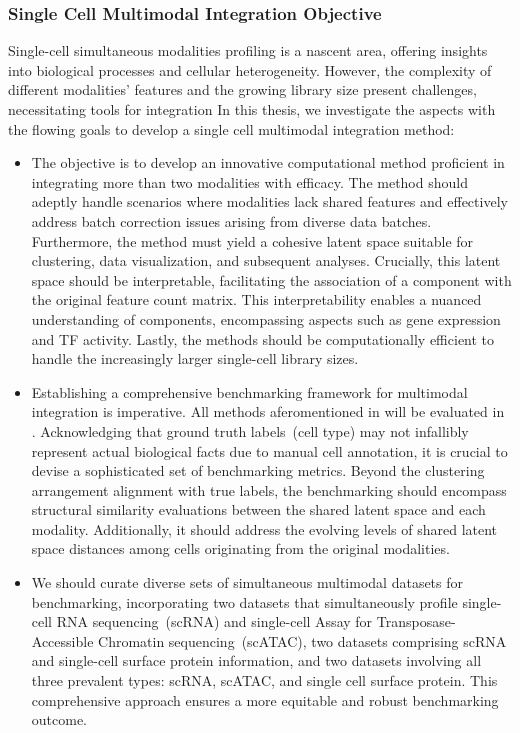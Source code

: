 \subsubsection{Single Cell Multimodal Integration Objective}
Single-cell simultaneous modalities profiling is a nascent area, offering insights into biological processes and cellular heterogeneity. However, the complexity of different modalities' features and the growing library size present challenges, necessitating tools for integration In this thesis, we investigate the aspects with the flowing goals to develop a single cell multimodal integration method:

\begin{itemize}
	\item
	The objective is to develop an innovative computational method proficient in integrating more than two modalities with efficacy. The method should adeptly handle scenarios where modalities lack shared features and effectively address batch correction issues arising from diverse data batches. Furthermore, the method must yield a cohesive latent space suitable for clustering, data visualization, and subsequent analyses. Crucially, this latent space should be interpretable, facilitating the association of a component with the original feature count matrix. This interpretability enables a nuanced understanding of components, encompassing aspects such as gene expression and TF activity. Lastly, the methods should be computationally efficient to handle the increasingly larger single-cell library sizes.
	\item
	Establishing a comprehensive benchmarking framework for multimodal integration is imperative. All methods aferomentioned in  will be evaluated in . Acknowledging that ground truth labels~(cell type) may not infallibly represent actual biological facts due to manual cell annotation, it is crucial to devise a sophisticated set of benchmarking metrics. Beyond the clustering arrangement alignment with true labels, the benchmarking should encompass structural similarity evaluations between the shared latent space and each modality. Additionally, it should address the evolving levels of shared latent space distances among cells originating from the original modalities.

	\item
	We should curate diverse sets of simultaneous multimodal datasets for benchmarking, incorporating two datasets that simultaneously profile single-cell RNA sequencing~(scRNA) and single-cell Assay for Transposase-Accessible Chromatin sequencing~(scATAC), two datasets comprising scRNA and single-cell surface protein information, and two datasets involving all three prevalent types: scRNA, scATAC, and single cell surface protein. This comprehensive approach ensures a more equitable and robust benchmarking outcome.


\end{itemize}
